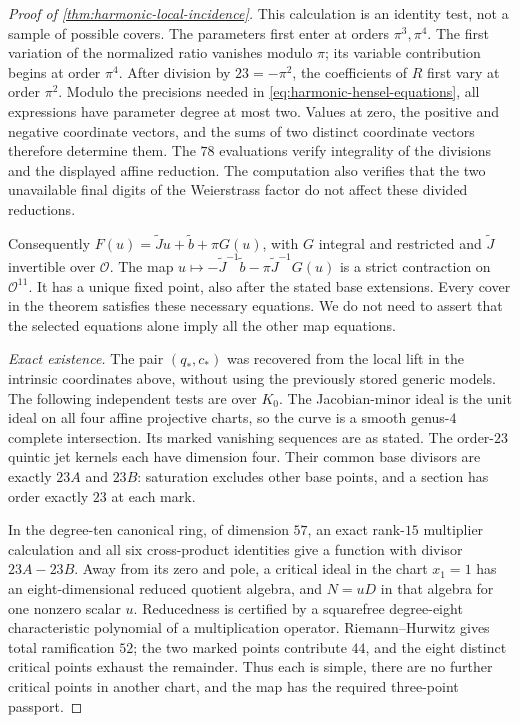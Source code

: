 \begin{proof}[Proof of \cref{thm:harmonic-local-incidence}]
This calculation is an identity test, not a sample of possible covers.
The parameters first enter at orders $\pi^3,\pi^4$.
The first variation of the normalized ratio vanishes modulo $\pi$;
its variable contribution begins at order $\pi^4$.
After division by $23=-\pi^2$, the coefficients of $R$ first vary
at order $\pi^2$.  Modulo the precisions needed in
\cref{eq:harmonic-hensel-equations}, all expressions have parameter
degree at most two.  Values at zero, the positive and negative
coordinate vectors, and the sums of two distinct coordinate vectors
therefore determine them.  The $78$ evaluations verify integrality
of the divisions and the displayed affine reduction.
The computation also verifies that the two unavailable final digits
of the Weierstrass factor do not affect these divided reductions.

Consequently $F(u)=\widetilde J u+\widetilde b+\pi G(u)$, with
$G$ integral and restricted and $\widetilde J$ invertible over
$\mathcal O$.  The map
$u\mapsto-\widetilde J^{-1}\widetilde b
          -\pi\widetilde J^{-1}G(u)$
is a strict contraction on $\mathcal O^{11}$.
It has a unique fixed point, also after the stated base extensions.
Every cover in the theorem satisfies these necessary equations.
We do not need to assert that the selected equations alone imply
all the other map equations.

\emph{Exact existence.}
The pair $(q_*,c_*)$ was recovered from the local lift in the
intrinsic coordinates above, without using the previously stored
generic models.  The following independent tests are over $K_0$.
The Jacobian-minor ideal is the unit ideal on all four affine
projective charts, so the curve is a smooth genus-$4$ complete
intersection.  Its marked vanishing sequences are as stated.
The order-$23$ quintic jet kernels each have dimension four.
Their common base divisors are exactly $23A$ and $23B$: saturation
excludes other base points, and a section has order exactly $23$
at each mark.

In the degree-ten canonical ring, of dimension $57$, an exact
rank-$15$ multiplier calculation and all six cross-product
identities give a function with divisor $23A-23B$.
Away from its zero and pole, a critical ideal in the chart $x_1=1$
has an eight-dimensional reduced quotient algebra, and $N=uD$
in that algebra for one nonzero scalar $u$.
Reducedness is certified by a squarefree degree-eight characteristic
polynomial of a multiplication operator.
Riemann--Hurwitz gives total ramification $52$; the two marked
points contribute $44$, and the eight distinct critical points
exhaust the remainder.  Thus each is simple, there are no further
critical points in another chart, and the map has the required
three-point passport.


\end{proof}
